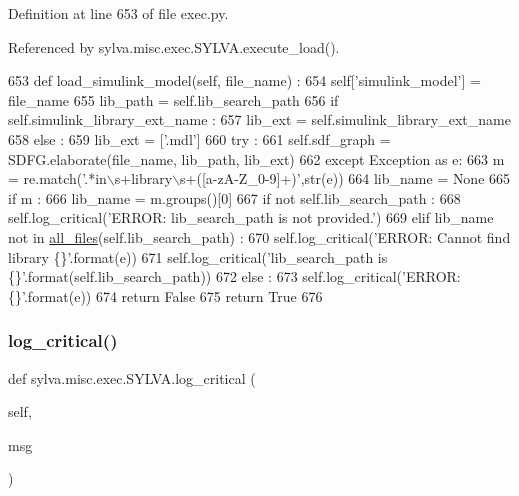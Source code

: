 Definition at line 653 of file exec.\+py.



Referenced by sylva.\+misc.\+exec.\+S\+Y\+L\+V\+A.\+execute\+\_\+load().


\begin{DoxyCode}
653   \textcolor{keyword}{def }load\_simulink\_model(self, file\_name) :
654     self[\textcolor{stringliteral}{'simulink\_model'}] = file\_name
655     lib\_path = self.lib\_search\_path
656     \textcolor{keywordflow}{if} self.simulink\_library\_ext\_name :
657       lib\_ext = self.simulink\_library\_ext\_name
658     \textcolor{keywordflow}{else} :
659       lib\_ext = [\textcolor{stringliteral}{'.mdl'}]
660     \textcolor{keywordflow}{try} :
661       self.sdf\_graph = SDFG.elaborate(file\_name, lib\_path, lib\_ext)
662     \textcolor{keywordflow}{except} Exception \textcolor{keyword}{as} e:
663       m = re.match(\textcolor{stringliteral}{'.*in\(\backslash\)s+library\(\backslash\)s+([a-zA-Z\_0-9]+)'},str(e))
664       lib\_name = \textcolor{keywordtype}{None}
665       \textcolor{keywordflow}{if} m :
666         lib\_name = m.groups()[0]
667       \textcolor{keywordflow}{if} \textcolor{keywordflow}{not} self.lib\_search\_path :
668         self.log\_critical(\textcolor{stringliteral}{'ERROR: lib\_search\_path is not provided.'})
669       \textcolor{keywordflow}{elif} lib\_name \textcolor{keywordflow}{not} \textcolor{keywordflow}{in} \hyperlink{namespacesylva_1_1misc_1_1util_a5dfe1979a130725652883d277a24ee5d}{all\_files}(self.lib\_search\_path) :
670         self.log\_critical(\textcolor{stringliteral}{'ERROR: Cannot find library \{\}'}.format(e))
671         self.log\_critical(\textcolor{stringliteral}{'lib\_search\_path is \{\}'}.format(self.lib\_search\_path))
672       \textcolor{keywordflow}{else} :
673         self.log\_critical(\textcolor{stringliteral}{'ERROR: \{\}'}.format(e))
674       \textcolor{keywordflow}{return} \textcolor{keyword}{False}
675     \textcolor{keywordflow}{return} \textcolor{keyword}{True}
676 
\end{DoxyCode}
\mbox{\label{classsylva_1_1misc_1_1exec_1_1_s_y_l_v_a_a1eb3697e042c8566d384d6f4d134a94c}} 
\subsubsection{\texorpdfstring{log\+\_\+critical()}{log\_critical()}}
{\footnotesize\ttfamily def sylva.\+misc.\+exec.\+S\+Y\+L\+V\+A.\+log\+\_\+critical (\begin{DoxyParamCaption}\item[{}]{self,  }\item[{}]{msg }\end{DoxyParamCaption})}




